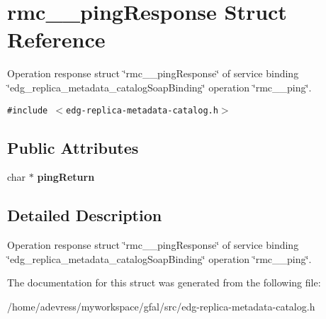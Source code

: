 \section{rmc\_\-\_\-ping\-Response Struct Reference}
\label{structrmc____pingResponse}
Operation response struct \char`\"{}rmc\_\-\_\-ping\-Response\char`\"{} of service binding \char`\"{}edg\_\-replica\_\-metadata\_\-catalog\-Soap\-Binding\char`\"{} operation \char`\"{}rmc\_\-\_\-ping\char`\"{}.  


{\tt \#include $<$edg-replica-metadata-catalog.h$>$}

\subsection*{Public Attributes}
\begin{CompactItemize}
\item 
char $\ast$ \textbf{ping\-Return}\label{structrmc____pingResponse_5d2ea03dc0e53f7780704062edfebbd9}

\end{CompactItemize}


\subsection{Detailed Description}
Operation response struct \char`\"{}rmc\_\-\_\-ping\-Response\char`\"{} of service binding \char`\"{}edg\_\-replica\_\-metadata\_\-catalog\-Soap\-Binding\char`\"{} operation \char`\"{}rmc\_\-\_\-ping\char`\"{}. 



The documentation for this struct was generated from the following file:\begin{CompactItemize}
\item 
/home/adevress/myworkspace/gfal/src/edg-replica-metadata-catalog.h\end{CompactItemize}

